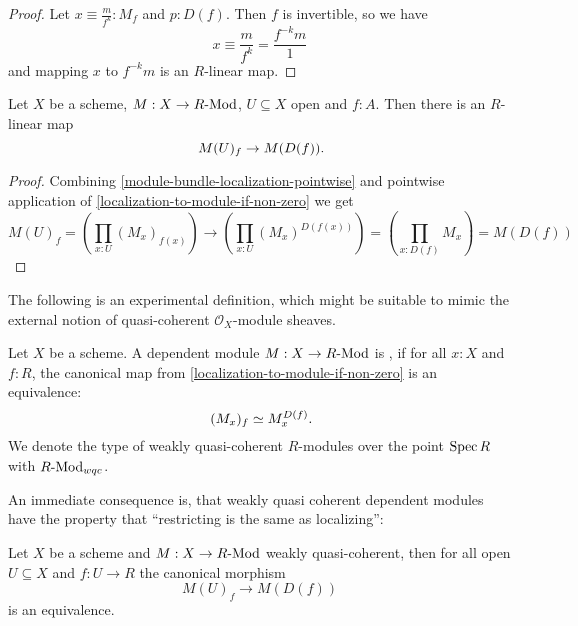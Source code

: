 \begin{proof}
  Let $x\equiv \frac{m}{f^k}:M_f$ and $p:D(f)$.
  Then $f$ is invertible, so we have
  \[
    x\equiv \frac{m}{f^k}=\frac{f^{-k}m}{1}
  \]
  and mapping $x$ to $f^{-k}m$ is an $R$-linear map.
  
\end{proof}

\begin{lemma}%
  \label{localization-to-restriction}                    
  Let $X$ be a scheme, $M:X\to R\text{-}\mathrm{Mod}$, $U\subseteq X$ open and $f:A$.
  Then there is an $R$-linear map
  \[
    M(U)_f \to M(D(f)) 
    \rlap{.}
  \]
\end{lemma}

\begin{proof}
  Combining \cref{module-bundle-localization-pointwise}
  and pointwise application of \cref{localization-to-module-if-non-zero} we get
  \[
    M(U)_f=\left(\prod_{x:U}(M_x)_{f(x)}\right)\to \left(\prod_{x:U}(M_x)^{D(f(x))}\right)
    =\left(\prod_{x:D(f)}M_x\right)
    =M(D(f))
  \]
\end{proof}

The following is an experimental definition,
which might be suitable
to mimic the external notion of quasi-coherent $\mathcal O_X$-module sheaves.

\begin{definition}%
  \label{quasi-coherent-bundle}
  Let $X$ be a scheme.
  A dependent module $M:X\to R\text{-}\mathrm{Mod}$ is ,
  if for all $x:X$ and $f:R$,
  the canonical map from \cref{localization-to-module-if-non-zero} is an equivalence:
  \[
    (M_x)_f\simeq M_x^{D(f)}
    \rlap{.}
  \]
  We denote the type of weakly quasi-coherent $R$-modules
  over the point $\operatorname{Spec} R$ with $R\text{-}\mathrm{Mod}_{wqc}$.
\end{definition}

An immediate consequence is, that
weakly quasi coherent dependent modules have
the property that ``restricting is the same as localizing'':

\begin{lemma}
  \label{weakly-quasi-coherent-open-localization}
  Let $X$ be a scheme and $M:X\to R\text{-}\mathrm{Mod}$ weakly quasi-coherent,
  then for all open $U\subseteq X$ and $f:U\to R$
  the canonical morphism
  \[
    M(U)_f\to M(D(f))
  \]
  is an equivalence.
\end{lemma}

